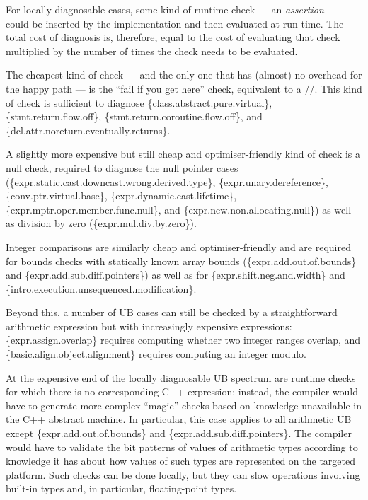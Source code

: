 For locally diagnosable cases, some kind of runtime check --- an \emph{assertion} --- could be inserted by the implementation and then evaluated at run time. The total cost of diagnosis is, therefore, equal to the cost of evaluating that check multiplied by the number of times the check needs to be evaluated.

The cheapest kind of check --- and the only one that has (almost) no overhead for the happy path --- is the ``fail if you get here'' check, equivalent to a //. This kind of check is sufficient to diagnose \{class.abstract.pure.virtual\}, \{stmt.return.flow.off\}, \{stmt.return.coroutine.flow.off\}, and \{dcl.attr.noreturn.eventually.returns\}.

A slightly more expensive but still cheap and optimiser-friendly kind of check is a null check, required to diagnose the null pointer cases  
(\{expr.static.cast.downcast.wrong.derived.type\},
\{expr.unary.deref\-erence\},
\{conv.ptr.virtual.base\},
\{expr.dynamic.cast.lifetime\}, 
\{expr.mptr.oper.member.\linebreak[3]func.null\}, and
\{expr.new.non.allocating.null\})
as well as division by zero (\{expr.mul.div.by.zero\}).

Integer comparisons are similarly cheap and optimiser-friendly and are   required for bounds checks with statically known array bounds
(\{expr.add.out.of.bounds\} and
\{expr.add.sub.diff.pointers\})
as well as for \{expr.shift.neg.and.width\} 
and \{intro.execution.unsequenced.modification\}.

Beyond this, a number of UB cases can still be checked by a straightforward arithmetic expression but with increasingly expensive expressions: \{expr.assign.overlap\} requires computing whether two integer ranges overlap, and  \{basic.align.object.alignment\} requires computing an integer modulo. 

At the expensive end of the locally diagnosable UB spectrum are runtime checks for which there is no corresponding C++ expression; instead, the compiler would have to generate more complex ``magic'' checks based on knowledge unavailable in the C++ abstract machine. In particular, this case applies to all arithmetic UB except \{expr.add.out.of.bounds\} and
\{expr.add.sub.diff.pointers\}. The compiler would have to validate the bit patterns of values of arithmetic types according to knowledge it has about how values of such types are represented on the targeted platform. Such checks can be done locally, but they can slow operations involving built-in types and, in particular, floating-point types.

